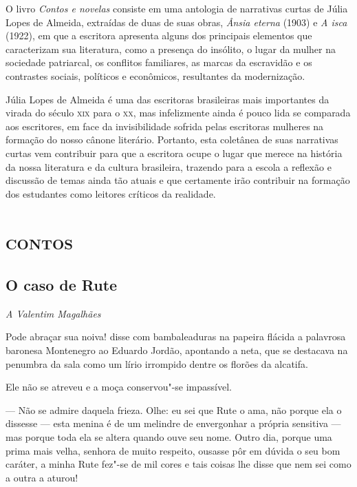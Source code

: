 
O livro \emph{Contos e novelas} consiste em uma antologia de narrativas
curtas de Júlia Lopes de Almeida, extraídas de duas de suas obras,
\emph{Ânsia eterna} (1903) e \emph{A isca} (1922), em que a escritora
apresenta alguns dos principais elementos que caracterizam sua
literatura, como a presença do insólito, o lugar da mulher na sociedade
patriarcal, os conflitos familiares, as marcas da escravidão e os
contrastes sociais, políticos e econômicos, resultantes da modernização.


Júlia Lopes de Almeida é uma das escritoras brasileiras mais importantes
da virada do século \textsc{xix} para o \textsc{xx}, mas infelizmente ainda é pouco lida
se comparada aos escritores, em face da invisibilidade sofrida pelas
escritoras mulheres na formação do nosso cânone literário. Portanto,
esta coletânea de suas narrativas curtas vem contribuir para que a
escritora ocupe o lugar que merece na história da nossa literatura e da
cultura brasileira, trazendo para a escola a reflexão e discussão de
temas ainda tão atuais e que certamente irão contribuir na formação dos
estudantes como leitores críticos da realidade.


\part{\textsc{contos}}

\chapter{O caso de Rute}

\hfill\emph{A Valentim Magalhães}

\bigskip

\noindent{}Pode abraçar sua noiva! disse com bambaleaduras na papeira flácida a
palavrosa baronesa Montenegro ao Eduardo Jordão, apontando a neta, que
se destacava na penumbra da sala como um lírio irrompido dentre os
florões da alcatifa.

Ele não se atreveu e a moça conservou"-se impassível.

--- Não se admire daquela frieza. Olhe: eu sei que Rute o ama, não porque
ela o dissesse --- esta menina é de um melindre de envergonhar a própria
sensitiva --- mas porque toda ela se altera quando ouve seu nome. Outro
dia, porque uma prima mais velha, senhora de muito respeito, ousasse pôr
em dúvida o seu bom caráter, a minha Rute fez"-se de mil cores e tais
coisas lhe disse que nem sei como a outra a aturou!

